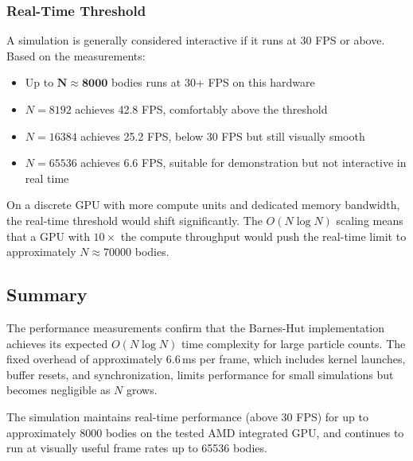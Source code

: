 \documentclass[12pt]{article}
\begin{document}
\subsubsection{Real-Time Threshold}

A simulation is generally considered interactive if it runs at 30 FPS or above.
Based on the measurements:

\begin{itemize}
    \item Up to $\mathbf{N \approx 8000}$ bodies runs at 30+ FPS on this hardware
    \item $N = 8192$ achieves 42.8 FPS, comfortably above the threshold
    \item $N = 16384$ achieves 25.2 FPS, below 30 FPS but still visually smooth
    \item $N = 65536$ achieves 6.6 FPS, suitable for demonstration but not
          interactive in real time
\end{itemize}

On a discrete GPU with more compute units and dedicated memory bandwidth,
the real-time threshold would shift significantly. The $O(N \log N)$ scaling
means that a GPU with $10\times$ the compute throughput would push the
real-time limit to approximately $N \approx 70000$ bodies.

\subsection{Summary}

The performance measurements confirm that the Barnes-Hut implementation
achieves its expected $O(N \log N)$ time complexity for large particle
counts. The fixed overhead of approximately 6.6\,ms per frame, which includes
kernel launches, buffer resets, and synchronization, limits performance for
small simulations but becomes negligible as $N$ grows.

The simulation maintains real-time performance (above 30 FPS) for up to
approximately 8000 bodies on the tested AMD integrated GPU, and continues
to run at visually useful frame rates up to 65536 bodies.
\end{document}
